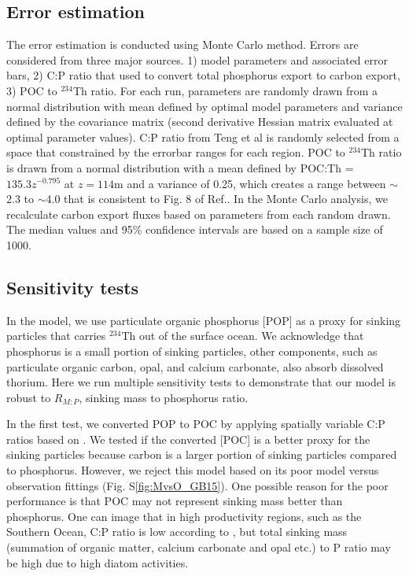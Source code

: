 \subsection{Error estimation}
The error estimation is conducted using Monte Carlo method. Errors are considered from three major sources.
1) model parameters and associated error bars, 2) C:P ratio that used to convert total phosphorus export to carbon export, 3) POC to $^{234}$Th ratio.
For each run, parameters are randomly drawn from a normal distribution with mean defined by optimal model parameters and variance defined by the covariance matrix (second derivative Hessian matrix evaluated at optimal parameter values).
C:P ratio from Teng et al is randomly selected from a space that constrained by the errorbar ranges for each region.
POC to $^{234}$Th ratio is drawn from a normal distribution with a mean defined by POC:Th = $135.3z^{-0.795}$ at $z = 114 $m and a variance of 0.25, which creates a range between $\sim$2.3 to $\sim$4.0 that is consistent to Fig. 8 of Ref.\citep{Owens2015}.
In the Monte Carlo analysis, we recalculate carbon export fluxes based on parameters from each random drawn.
The median values and 95\% confidence intervals are based{} on a sample size of 1000.

\subsection{Sensitivity tests}
In the model, we use particulate organic phosphorus [POP] as a proxy for sinking particles that carries $^{234}$Th out of the surface ocean.
We acknowledge that phosphorus is a small portion of sinking particles, other components, such as particulate organic carbon, opal, and calcium carbonate, also absorb dissolved thorium.
Here we run multiple sensitivity tests to demonstrate that our model is robust to $R_{M:P}$, sinking mass to phosphorus ratio.

In the first test, we converted POP to POC by applying spatially variable C:P ratios based on \cite{Galbraith2015}.
We tested if the converted [POC] is a better proxy for the sinking particles because carbon is a larger portion of sinking particles compared to phosphorus.
However, we reject this model based on its poor model versus observation fittings (Fig. S\ref{fig:MvsO_GB15}).
One possible reason for the poor performance is that POC may not represent sinking mass better than phosphorus.
One can image that in high productivity regions, such as the Southern Ocean, C:P ratio is low according to \cite{Galbraith2015}, but total sinking mass (summation of organic matter, calcium carbonate and opal etc.) to P ratio may be high due to high diatom activities.

